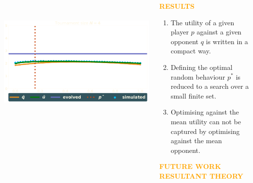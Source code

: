 \documentclass[usenames,dvipsnames,t]{beamer}
\begin{document}
\begin{columns}
\begin{column}{.7\linewidth}
\begin{columns}
\begin{column}{.5\linewidth}
\begin{center}
                 \\
                 \\
                \includegraphics[width=.5\textwidth]{static/tournament}

            \end{center}
        \end{column}
    \end{columns}
    \end{column}
    \begin{column}{.2\linewidth}
        \begin{center}
            \textcolor{orange}{\textbf{\Large{RESULTS}}}
        \begin{center}
            \begin{enumerate}
                \item The utility of a given player \(p\) against a given opponent \(q\) 
                is written in a compact way.
                \item Defining the optimal random behaviour \(p ^ *\) is reduced to a search over a small finite set.
                \item Optimising against the mean utility can not be captured by optimising against the mean opponent.
            \end{enumerate}
            \vspace{3cm}
    
            \begin{center}
                \textcolor{orange}{\textbf{\Large{FUTURE WORK}}} \\
                \textcolor{orange}{\textbf{\small{RESULTANT THEORY}}}
            \end{center}
        \begin{center}
            
        \end{center}
        \end{center}
        \end{center}
    \end{column}
\end{columns}
\vspace{1.5cm}
\end{document}
